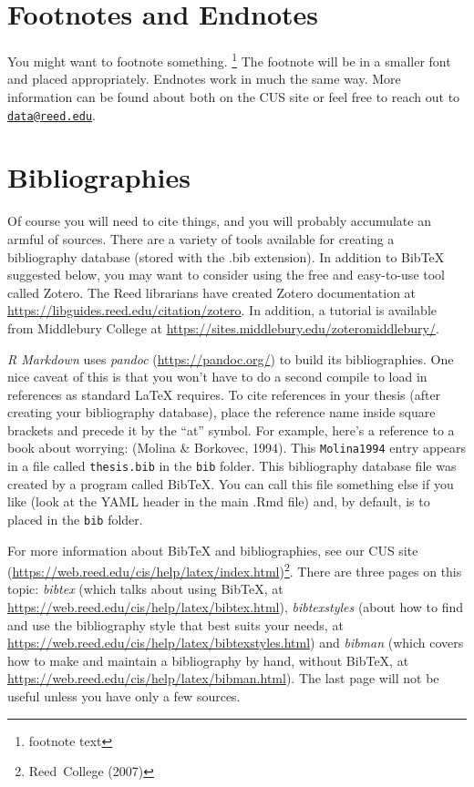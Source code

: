 \documentclass[12pt,twoside]{reedthesis}
\begin{document}
\hypertarget{footnotes-and-endnotes}{%
\section{Footnotes and Endnotes}\label{footnotes-and-endnotes}}

You might want to footnote something. \footnote{footnote text} The footnote will be in a smaller font and placed appropriately. Endnotes work in much the same way. More information can be found about both on the CUS site or feel free to reach out to \href{mailto:data@reed.edu}{\nolinkurl{data@reed.edu}}.

\hypertarget{bibliographies}{%
\section{Bibliographies}\label{bibliographies}}

Of course you will need to cite things, and you will probably accumulate an armful of sources. There are a variety of tools available for creating a bibliography database (stored with the .bib extension). In addition to BibTeX suggested below, you may want to consider using the free and easy-to-use tool called Zotero. The Reed librarians have created Zotero documentation at \url{https://libguides.reed.edu/citation/zotero}. In addition, a tutorial is available from Middlebury College at \url{https://sites.middlebury.edu/zoteromiddlebury/}.

\emph{R Markdown} uses \emph{pandoc} (\url{https://pandoc.org/}) to build its bibliographies. One nice caveat of this is that you won't have to do a second compile to load in references as standard LaTeX requires. To cite references in your thesis (after creating your bibliography database), place the reference name inside square brackets and precede it by the ``at'' symbol. For example, here's a reference to a book about worrying: (Molina \& Borkovec, 1994). This \texttt{Molina1994} entry appears in a file called \texttt{thesis.bib} in the \texttt{bib} folder. This bibliography database file was created by a program called BibTeX. You can call this file something else if you like (look at the YAML header in the main .Rmd file) and, by default, is to placed in the \texttt{bib} folder.

For more information about BibTeX and bibliographies, see our CUS site (\url{https://web.reed.edu/cis/help/latex/index.html})\footnote{Reed~College (2007)}. There are three pages on this topic: \emph{bibtex} (which talks about using BibTeX, at \url{https://web.reed.edu/cis/help/latex/bibtex.html}), \emph{bibtexstyles} (about how to find and use the bibliography style that best suits your needs, at \url{https://web.reed.edu/cis/help/latex/bibtexstyles.html}) and \emph{bibman} (which covers how to make and maintain a bibliography by hand, without BibTeX, at \url{https://web.reed.edu/cis/help/latex/bibman.html}). The last page will not be useful unless you have only a few sources.
\end{document}
